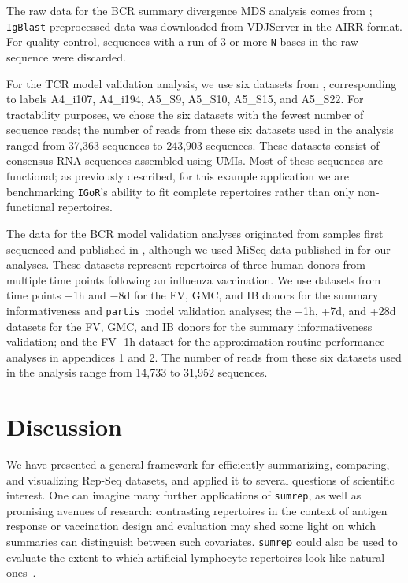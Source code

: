 \documentclass{article}
\newcommand{\partis}{\texttt{partis}}
\newcommand{\igor}{\texttt{IGoR}}
\newcommand{\igblast}{\texttt{IgBlast}}
\begin{document}
The raw data for the BCR summary divergence MDS analysis comes from \cite{Rubelt2016-tl}; \igblast-preprocessed data was downloaded from VDJServer in the AIRR format.
For quality control, sequences with a run of 3 or more \texttt{N} bases in the raw sequence were discarded.

For the TCR model validation analysis, we use six datasets from \cite{Britanova2016-iw}, corresponding to labels A4\_i107, A4\_i194, A5\_S9, A5\_S10, A5\_S15, and A5\_S22.
For tractability purposes, we chose the six datasets with the fewest number of sequence reads; the number of reads from these six datasets used in the analysis ranged from 37,363 sequences to 243,903 sequences.
These datasets consist of consensus RNA sequences assembled using UMIs.
Most of these sequences are functional; as previously described, for this example application we are benchmarking \igor's ability to fit complete repertoires rather than only non-functional repertoires.

The data for the BCR model validation analyses originated from samples first sequenced and published in \cite{Laserson2014-dx}, although we used MiSeq data published in \cite{Gupta2017-ve} for our analyses.
These datasets represent repertoires of three human donors from multiple time points following an influenza vaccination.
We use datasets from time points $-$1h and $-$8d for the FV, GMC, and IB donors for the summary informativeness and \partis\ model validation analyses; the +1h, +7d, and +28d datasets for the FV, GMC, and IB donors for the summary informativeness validation; and the FV -1h dataset for the approximation routine performance analyses in appendices 1 and 2.
The number of reads from these six datasets used in the analysis range from 14,733 to 31,952 sequences.



\section*{Discussion}
We have presented a general framework for efficiently summarizing, comparing, and visualizing Rep-Seq datasets, and applied it to several questions of scientific interest.
One can imagine many further applications of \texttt{sumrep}, as well as promising avenues of research: contrasting repertoires in the context of antigen response or vaccination design and evaluation may shed some light on which summaries can distinguish between such covariates.
\texttt{sumrep} could also be used to evaluate the extent to which artificial lymphocyte repertoires look like natural ones~\cite{Finlay2012}.
\end{document}
